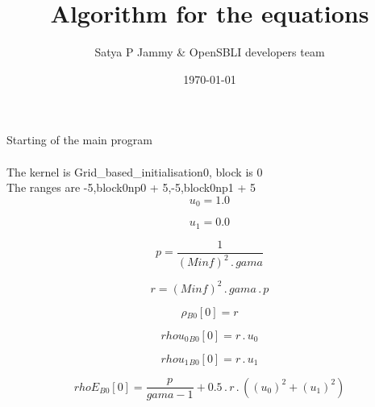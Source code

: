 \documentclass{article}
\title{Algorithm for the equations}
\author{Satya P Jammy \& OpenSBLI developers team}
\date{\today}
\begin{document}
\maketitle
\noindent Starting of the main program\\
\\\noindent The kernel is Grid_based_initialisation0, block is 0\\\noindent The ranges are -5,block0np0 + 5,-5,block0np1 + 5\\\begin{dmath}u_{0} = 1.0\end{dmath}

\begin{dmath}u_{1} = 0.0\end{dmath}

\begin{dmath}p = \frac{1}{\left(Minf \right)^{2} \,.\, gama}\end{dmath}

\begin{dmath}r = \left(Minf \right)^{2} \,.\, gama \,.\, p\end{dmath}

\begin{dmath}{\rho{_{B0}}}[{0}] = r\end{dmath}

\begin{dmath}{rhou_{0}{_{B0}}}[{0}] = r \,.\, u_{0}\end{dmath}

\begin{dmath}{rhou_{1}{_{B0}}}[{0}] = r \,.\, u_{1}\end{dmath}

\begin{dmath}{rhoE{_{B0}}}[{0}] = \frac{p}{gama - 1} + 0.5 \,.\, r \,.\, \left(\left(u_{0} \right)^{2} + \left(u_{1} \right)^{2}\right)\end{dmath}
\end{document}
